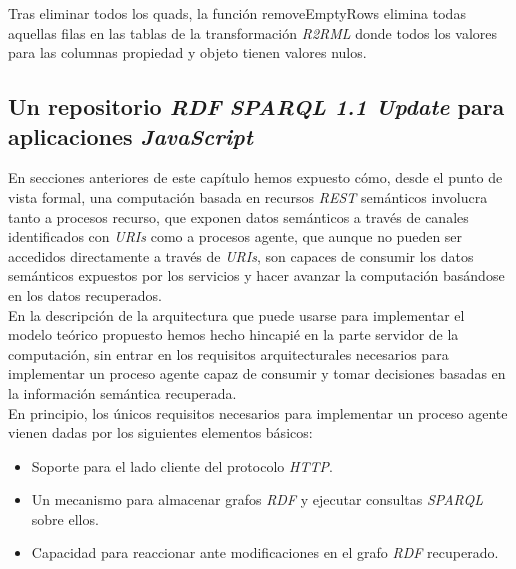 Tras eliminar todos los quads, la funci\'on removeEmptyRows elimina todas aquellas filas en las tablas de la transformaci\'on \textit{R2RML} donde todos los valores para las columnas propiedad y objeto tienen valores nulos.

\subsection{Un repositorio \textit{RDF} \textit{SPARQL 1.1 Update} para aplicaciones \textit{JavaScript}}
\label{sec:rdfstorejs}

En secciones anteriores de este cap\'itulo hemos expuesto c\'omo, desde el punto de vista formal, una computaci\'on basada en recursos \textit{REST} sem\'anticos involucra tanto a procesos recurso, que exponen datos sem\'anticos a trav\'es de canales identificados con \textit{URIs} como a procesos agente, que aunque no pueden ser accedidos directamente a trav\'es de \textit{URIs}, son capaces de consumir los datos sem\'anticos expuestos por los servicios y hacer avanzar la computaci\'on bas\'andose en los datos recuperados.\\
En la descripci\'on de la arquitectura que puede usarse para implementar el modelo te\'orico propuesto hemos hecho hincapi\'e en la parte servidor de la computaci\'on, sin entrar en los requisitos arquitecturales necesarios para implementar un proceso agente capaz de consumir y tomar decisiones basadas en la informaci\'on sem\'antica recuperada.\\
En principio, los \'unicos requisitos necesarios para implementar un proceso agente vienen dadas por los siguientes elementos b\'asicos:

\begin{itemize}
\item Soporte para el lado cliente del protocolo \textit{HTTP}.
\item Un mecanismo para almacenar grafos \textit{RDF} y ejecutar consultas \textit{SPARQL} sobre ellos.
\item Capacidad para reaccionar ante modificaciones en el grafo \textit{RDF} recuperado.
\end{itemize}

